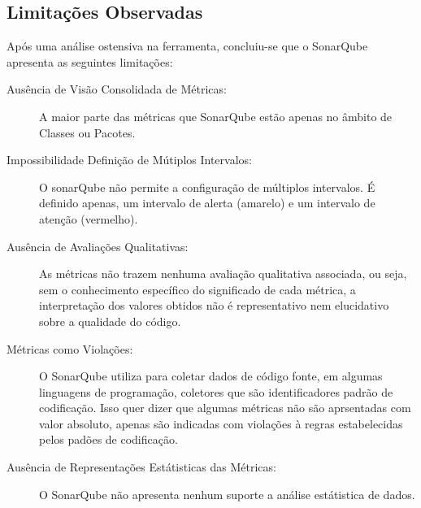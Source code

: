

\subsection {Limitações Observadas}
Após uma análise ostensiva na ferramenta, concluiu-se que o SonarQube apresenta as seguintes limitações:
\begin{description}

  \item [Ausência de Visão Consolidada de Métricas:]  A maior parte das métricas que SonarQube estão apenas no âmbito de Classes 		   ou Pacotes.

  \item [Impossibilidade Definição de Mútiplos Intervalos:]  O sonarQube não permite a configuração de múltiplos intervalos. É definido apenas, um intervalo de alerta (amarelo) e um intervalo de atenção (vermelho).

\item [Ausência de Avaliações Qualitativas:] As métricas não trazem nenhuma avaliação qualitativa associada, ou seja, sem o conhecimento específico do significado de cada métrica, a interpretação dos valores obtidos não é representativo nem elucidativo sobre a qualidade do código.

\item [Métricas como Violações:] O SonarQube utiliza para coletar dados de código fonte, em algumas linguagens de programação, coletores que são identificadores padrão de codificação. Isso quer dizer que algumas métricas não são aprsentadas com valor absoluto, apenas são indicadas com violações à regras estabelecidas pelos padões de codificação.

\item [Ausência de Representações Estátisticas das Métricas:] O SonarQube não apresenta nenhum suporte a análise estátistica de dados.

\end{description}





